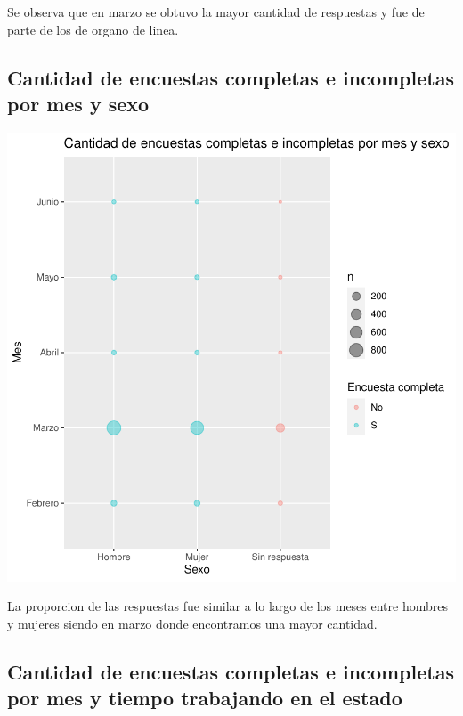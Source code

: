 \documentclass{article}
\begin{document}
Se observa que en marzo se obtuvo la mayor cantidad de respuestas y fue de parte de los de organo de linea.

\subsection{Cantidad de encuestas completas e incompletas por mes y sexo}

\includegraphics{seguimientov3-026}

La proporcion de las respuestas fue similar a lo largo de los meses entre hombres y mujeres siendo en marzo donde encontramos una mayor cantidad.

\subsection{Cantidad de encuestas completas e incompletas por mes y tiempo trabajando en el estado}
\end{document}
